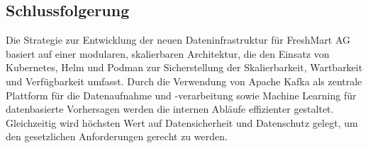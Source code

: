 \documentclass[%
pdftex,
oneside,			%
11pt,				%
parskip=half,		%
headheight = 12pt,	%
headsepline,		%
footsepline,		%
footheight = 16pt,	%
abstracton,		%
DIV=calc,		%
BCOR=8mm,		%
headinclude=false,	%
footinclude=false,	%
listof=totoc,		%
toc=bibliography,	%
]{scrreprt}	%
\begin{document}
    \subsection{Schlussfolgerung}

        Die Strategie zur Entwicklung der neuen Dateninfrastruktur für FreshMart AG basiert auf einer modularen, skalierbaren Architektur, die den Einsatz von Kubernetes, Helm und Podman zur Sicherstellung der Skalierbarkeit, Wartbarkeit und Verfügbarkeit umfasst. 
        Durch die Verwendung von Apache Kafka als zentrale Plattform für die Datenaufnahme und -verarbeitung sowie Machine Learning für datenbasierte Vorhersagen werden die internen Abläufe effizienter gestaltet. Gleichzeitig wird höchsten Wert auf Datensicherheit und Datenschutz gelegt, um den gesetzlichen Anforderungen gerecht zu werden.




\ifx\VAlterZitierstil\VTrueValue
    \printbibliography
\else
    
    
\fi
\end{document}
